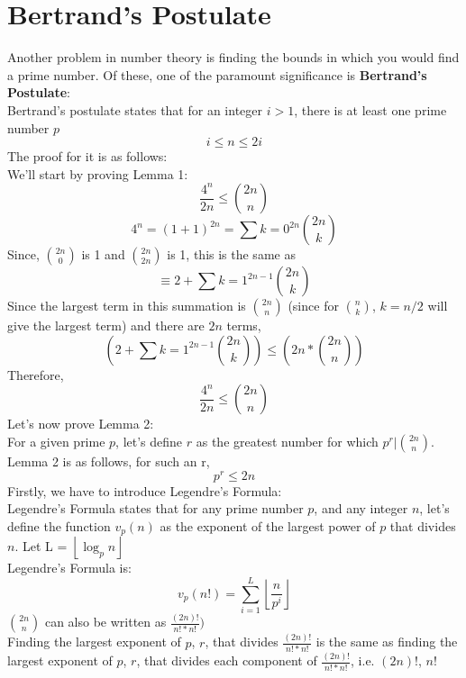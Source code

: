 \documentclass[12pt, letterpaper]{article}
\begin{document}
\section{Bertrand's Postulate}
Another problem in number theory is finding the bounds in which you would find a prime number. Of these, one of the paramount significance is \textbf{Bertrand's Postulate}: \\
Bertrand's postulate states that for an integer $i > 1$, there is at least one prime number $p$
\[
    i \leq n \leq 2i 
\]
The proof for it is as follows:\\
We'll start by proving Lemma 1:
\[
  \frac{4^n}{2n} \leq \binom{2n}{n}
\]
\[
    4^n = (1 + 1)^{2n} = \sum{k = 0}^{2n} \binom{2n}{k} 
\]
Since, $\binom{2n}{0}$ is 1 and $\binom{2n}{2n}$ is 1, this is the same as
\[
    \equiv 2 + \sum{k = 1}^{2n - 1} \binom{2n}{k} 
\]
Since the largest term in this summation is $\binom{2n}{n}$ (since for $\binom{n}{k}$, $k = n/2$ will give the largest term) and there are $2n$ terms, 
\[
     (2 + \sum{k = 1}^{2n - 1} \binom{2n}{k}) \leq (2n * \binom{2n}{n})
\]
Therefore, 
\[
    \frac{4^n}{2n} \leq \binom{2n}{n}
\]
Let's now prove Lemma 2:\\
For a given prime $p$, let's define $r$ as the greatest number for which $p^r | \binom{2n}{n}$. Lemma 2 is as follows, for such an r, 
\[
    p^r \le 2n
\]
Firstly, we have to introduce Legendre's Formula:\\
Legendre's Formula states that for any prime number $p$, and any integer $n$, let's define the function $v_p(n)$ as the exponent of the largest power of $p$ that divides $n$. Let L = $\left\lfloor \log_{p}{n} \right\rfloor$\\
Legendre's Formula is:
\[
    v_{p}(n!) = \sum_{i = 1}^{L} {\left\lfloor \frac{n}{p^i} \right\rfloor}
\]
$\binom{2n}{n}$ can also be written as $\frac{(2n)!}{n!*n!})$\\ Finding the largest exponent of $p$, $r$, that divides $\frac{(2n)!}{n!*n!}$ is the same as finding the largest exponent of $p$, $r$, that divides each component of $\frac{(2n)!}{n!*n!}$, i.e. $(2n)!$, $n!$
\end{document}
